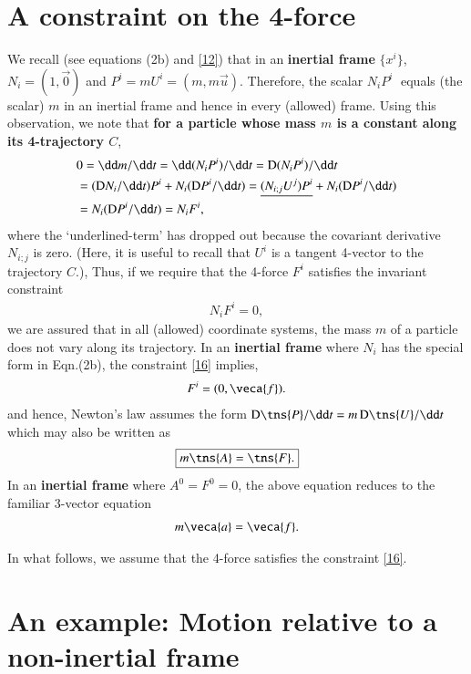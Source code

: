 \documentclass[10pt]{article}
\begin{document}
\section{A  constraint on the 4-force}
We recall (see equations (2b) and \eqref{12})  that in  an 
\textbf{inertial frame} $\{x^i\}$, $N_i=(1,\vec{0})$ and 
$P^i=mU^i= (m,m\vec{u})$. Therefore,  the scalar  
$N_iP^i\;$ equals (the scalar) $m$ in  an inertial frame 
and hence in every (allowed) frame. Using this 
observation, we note that  \textbf{for a particle whose mass 
$m$ is a constant along its 4-trajectory $C$},
\begin{align*}
&0 = \dd m/\dd t = \dd (N_i P^i )/\dd t =
{\mathrm{D}}(N_i P^i )/\dd t  \notag \\  
&=({\mathrm{D}}N_i/\dd t)P^i + N_i ({\mathrm{D}}P^i/\dd t) 
= 
\underline{(N_{i;j}U^j)P^i 
} +N_i({\mathrm{D}}P^i/\dd t) \notag \\  
&= N_i({\mathrm{D}}P^i/\dd t) = N_i F^i,
\end{align*}
where the `underlined-term' has dropped  out because the 
covariant derivative $N_{i;j}$ is zero. (Here, it is useful 
to recall that $U^i$ is a tangent 4-vector to the 
trajectory 
$C$.), Thus, if we require that the  4-force  $F^i $  
satisfies the  invariant constraint
\begin{align}\label{16}
N_i F^i =0,
\end{align}
we are assured that in all (allowed) coordinate systems, the 
mass $m$ of a particle does not vary along its trajectory. 
In an \textbf{inertial frame}
where $N_i$ has the special form in Eqn.(2b), the
constraint \eqref{16} implies, 
\begin{align}\label{17}
F^i =(0, \veca{f}).
\end{align}
and hence, Newton's law assumes the 
form ${{\mathrm{D}}}\tns{P}/\dd 
t=m\,{{\mathrm{D}}}\tns{U}/\dd t $  which may also be 
written as
\begin{align}\label{18}
\boxed{m\tns{A}  =\tns{F}.}
\end{align}
In an \textbf{inertial frame} where $ A^0 =F^0=0$, the above
equation reduces to the familiar 3-vector equation
\begin{align}\label{19}
m\veca{a}  =\veca{f}.
\end{align}

In what follows, we assume that the 4-force 
satisfies the constraint \eqref{16}.

\section{An example: Motion relative to a 
non-inertial frame}
\end{document}
